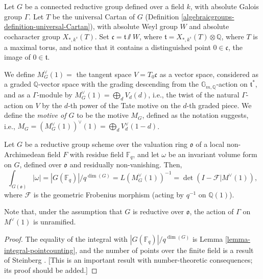\begin{definition}
\label{definition-motive-G}
		Let $G$ be a connected reductive group defined over a field $k$, with absolute Galois group $\Gamma$. Let $T$ be the universal Cartan of $G$ (Definition \ref{algebraicgroups-definition-universal-Cartan}), with absolute Weyl group $W$ and absolute cocharacter group $X_{*,k^s}(T)$. Set $\mathfrak c = \mathfrak t\sslash W$, where $\mathfrak t = X_{*,k^s}(T) \otimes \mathbb Q$, where $T$ is a maximal torus, and notice that it contains a distinguished point $0\in \mathfrak c$, the image of $0\in \mathfrak t$. 
		
		We define $M_G^\vee(1) = $ the tangent space $V=T_0\mathfrak c$ as a vector space, considered as a graded $\mathbb Q$-vector space with the grading descending from the $\mathbb G_{m, \mathbb Q}$-action on $\mathfrak t^*$, and as a $\Gamma$-module by $M_G^\vee(1)  = \bigoplus_d V_d(d)$, i.e., the twist of the natural $\Gamma$-action on $V$ by the $d$-th power of the Tate motive on the $d$-th graded piece. We define the {\it motive of $G$} to be the motive $M_G$, defined as the notation suggests, i.e., $M_G = (M_G^\vee(1))^\vee(1) = \bigoplus_d V_d^\vee(1-d)$.
\end{definition}
	
	
\begin{proposition}
\label{proposition-measure-integers}
		Let $G$ be a reductive group scheme over the valuation ring $\mathfrak o$ of a local non-Archimedean field $F$ with residue field $\mathbb F_q$, and let $\omega$ be an invariant volume form on $G$, defined over $\mathfrak o$ and residually non-vanishing. Then,
		\begin{equation}
		\label{equation-measure-integers}
		\int_{G(\mathfrak o)} |\omega| = |G(\mathbb F_q)|/q^{\dim(G)} = L(M_G^\vee(1))^{-1} = \det(I-\mathcal F|M^\vee(1)), 
		\end{equation}
		where $\mathcal F$ is the geometric Frobenius morphism (acting by $q^{-1} \text{ on } \mathbb Q(1)$).
\end{proposition}
	
Note that, under the assumption that $G$ is reductive over $\mathfrak o$, the action of $\Gamma$ on $M^\vee(1)$ is unramified.	

\begin{proof}
	The equality of the integral with $|G(\mathbb F_q)|/q^{\dim(G)}$ is Lemma \ref{lemma-integral-pointcounting},  and the number of points over the finite field is a result of Steinberg \cite[p79]{Steinberg-endomorphism}. [This is an important result with number-theoretic consequences; its proof should be added.]
\end{proof}
	
